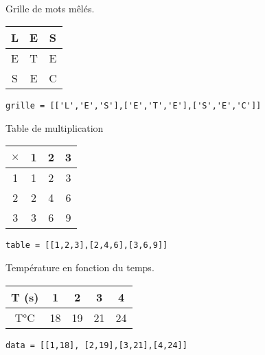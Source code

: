 \documentclass[t,10pt]{article}
\begin{document}
\begin{exemple}
~\\
\begin{minipage}[t]{.3\linewidth}
Grille de mots mêlés.
\begin{center}
\begin{tabular}{|c|c|c|}
\hline
L & E & S \\ \hline
E & T & E \\ \hline
S & E & C \\ \hline
\end{tabular}
\end{center}

\begin{lstlisting}
grille = [['L','E','S'],['E','T','E'],['S','E','C']]
\end{lstlisting}
\end{minipage}
\hfill
\begin{minipage}[t]{.3\linewidth}

Table de multiplication
\begin{center}
\begin{tabular}{|c||c|c|c|}
\hline
$\times $ & 1 & 2 & 3 \\
\hline
\hline
1 & 1 & 2 & 3 \\
2 & 2 & 4 &  6 \\
3 & 3 & 6 &  9 \\
\hline
\end{tabular}
\end{center}

\begin{lstlisting}
table = [[1,2,3],[2,4,6],[3,6,9]]
\end{lstlisting}
\end{minipage}
\hfill
\begin{minipage}[t]{.3\linewidth}

Température en fonction du temps.

\begin{center}
\begin{tabular}{|c|c|c|c|c|}
\hline
T (s)& 1 & 2 & 3 & 4 \\
 \hline
 T°C & 18 & 19 & 21 & 24 \\ 
\hline
\end{tabular}
\end{center}

\begin{lstlisting}
data = [[1,18], [2,19],[3,21],[4,24]]
\end{lstlisting}

\end{minipage}
\end{exemple}
\end{document}
